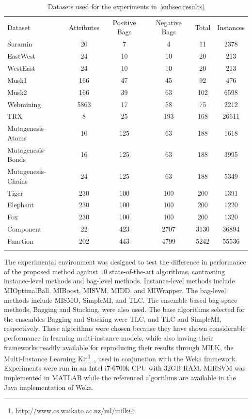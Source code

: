 \begin{table}[t!]
\caption{Datasets used for the experiments in~\ref{subsec:results}}
\small
\label{tab:Dataset}
\begin{tabularx}{\textwidth}{l@{\extracolsep{\fill}}ccccc}
\hline\noalign{\smallskip}
Dataset & Attributes & Positive Bags & Negative Bags & Total & Instances \\
\noalign{\smallskip}\hline\noalign{\smallskip}
Suramin 			& 20 	& 7 	& 4 	& 11 	& 2378 	\\
EastWest 			& 24 	& 10 	& 10 	& 20 	& 213 	\\
WestEast 			& 24 	& 10 	& 10 	& 20 	& 213 	\\
Musk1 				& 166 	& 47 	& 45 	& 92 	& 476 	\\
Musk2 				& 166 	& 39 	& 63 	& 102 	& 6598 	\\
Webmining			& 5863	& 17	& 58	& 75	& 2212	\\
TRX 				& 8 	& 25 	& 193 	& 168 	& 26611 \\
Mutagenesis-Atoms 	& 10 	& 125 	& 63 	& 188 	& 1618 	\\
Mutagenesis-Bonds 	& 16 	& 125 	& 63 	& 188 	& 3995 	\\
Mutagenesis-Chains 	& 24 	& 125 	& 63 	& 188 	& 5349 	\\
Tiger 				& 230 	& 100 	& 100 	& 200 	& 1391 	\\
Elephant 			& 230 	& 100 	& 100 	& 200 	& 1220 	\\
Fox 				& 230 	& 100 	& 100 	& 200 	& 1320 	\\
Component			& 22	& 423	& 2707	& 3130	& 36894	\\
Function			& 202	& 443	& 4799	& 5242	& 55536	\\
\noalign{\smallskip}\hline
\end{tabularx}
\end{table}

The experimental environment was designed to test the difference in performance of the proposed method against $10$ state-of-the-art algorithms, contrasting instance-level methods and bag-level methods. Instance-level methods include MIOptimalBall, MIBoost, MISVM, MIDD, and MIWrapper. The bag-level methods include MISMO, SimpleMI, and TLC. The ensemble-based bag-space methods, Bagging and Stacking, were also used. The base algorithms selected for the ensembles Bagging and Stacking were TLC, and TLC and SimpleMI, respectively. These algorithms were chosen because they have shown considerable performance in learning multi-instance models, while also having their frameworks readily available for reproducing their results through MILK, the Multi-Instance Learning Kit\footnote{http://www.cs.waikato.ac.nz/ml/milk}~\citep{Xu2003}, used in conjunction with the Weka framework. Experiments were run in an Intel i7-6700k CPU with 32GB RAM. MIRSVM was implemented in MATLAB while the referenced algorithms are available in the Java implementation of Weka.

